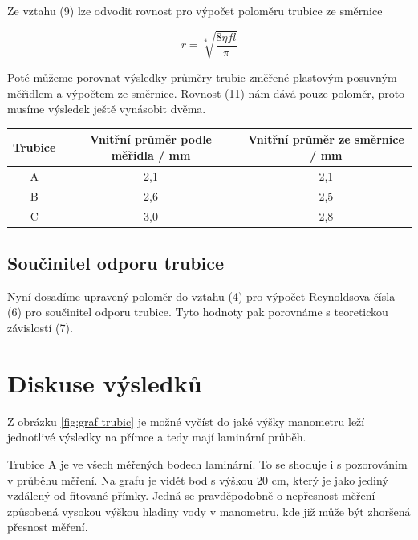     Ze vztahu (9) lze odvodit rovnost pro výpočet poloměru trubice ze směrnice

    \begin{equation}
        r = \sqrt[4]{\frac{8\eta fl}{\pi}}
    \end{equation}

    Poté můžeme porovnat výsledky průměry trubic změřené plastovým posuvným měřidlem a výpočtem ze směrnice. Rovnost (11) nám dává pouze poloměr, proto musíme výsledek ještě vynásobit dvěma.

    \begin{table}[h]
        \centering
        \begin{tabular}{|c|c|c|} 
        \hline
            Trubice & Vnitřní průměr podle měřidla / mm & Vnitřní průměr ze směrnice / mm  \\ 
        \hline
            A       & 2,1                           & 2,1                              \\
            B       & 2,6                           & 2,5                              \\
            C       & 3,0                           & 2,8                              \\
        \hline
        \end{tabular}
    \end{table}

\subsection{Součinitel odporu trubice}

    Nyní dosadíme upravený poloměr do vztahu (4) pro výpočet Reynoldsova čísla (6) pro součinitel odporu trubice. Tyto hodnoty pak porovnáme s teoretickou závislostí (7).

    
    
\section{Diskuse výsledků}

    Z obrázku \ref{fig:graf trubic} je možné vyčíst do jaké výšky manometru leží jednotlivé výsledky na přímce a tedy mají laminární průběh.

    Trubice A je ve všech měřených bodech laminární. To se shoduje i s pozorováním v průběhu měření. Na grafu je vidět bod s výškou 20 cm, který je jako jediný vzdálený od fitované přímky. Jedná se pravděpodobně o nepřesnost měření způsobená vysokou výškou hladiny vody v manometru, kde již může být zhoršená přesnost měření.

